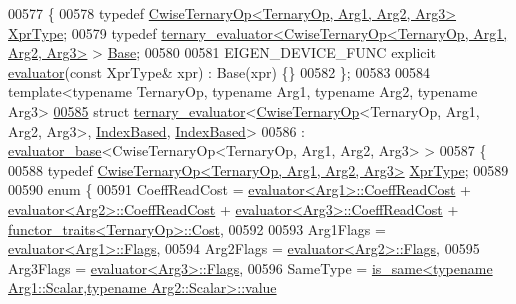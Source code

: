 \begin{DoxyCode}
00577 \{
00578   \textcolor{keyword}{typedef} \hyperlink{group___core___module_class_eigen_1_1_cwise_ternary_op}{CwiseTernaryOp<TernaryOp, Arg1, Arg2, Arg3>} 
      \hyperlink{group___core___module_class_eigen_1_1_cwise_ternary_op}{XprType};
00579   \textcolor{keyword}{typedef} \hyperlink{struct_eigen_1_1internal_1_1ternary__evaluator}{ternary\_evaluator<CwiseTernaryOp<TernaryOp, Arg1, Arg2, Arg3>}
       > \hyperlink{struct_eigen_1_1internal_1_1ternary__evaluator}{Base};
00580   
00581   EIGEN\_DEVICE\_FUNC \textcolor{keyword}{explicit} \hyperlink{struct_eigen_1_1internal_1_1evaluator}{evaluator}(\textcolor{keyword}{const} XprType& xpr) : Base(xpr) \{\}
00582 \};
00583 
00584 \textcolor{keyword}{template}<\textcolor{keyword}{typename} TernaryOp, \textcolor{keyword}{typename} Arg1, \textcolor{keyword}{typename} Arg2, \textcolor{keyword}{typename} Arg3>
\hyperlink{struct_eigen_1_1internal_1_1ternary__evaluator_3_01_cwise_ternary_op_3_01_ternary_op_00_01_arg1_daf42d21bcfee99cfa54e03ffa9506fc}{00585} \textcolor{keyword}{struct }\hyperlink{struct_eigen_1_1internal_1_1ternary__evaluator}{ternary\_evaluator}<\hyperlink{group___core___module_class_eigen_1_1_cwise_ternary_op}{CwiseTernaryOp}<TernaryOp, Arg1, Arg2, Arg3>, 
      \hyperlink{struct_eigen_1_1internal_1_1_index_based}{IndexBased}, \hyperlink{struct_eigen_1_1internal_1_1_index_based}{IndexBased}>
00586   : \hyperlink{struct_eigen_1_1internal_1_1evaluator__base}{evaluator\_base}<CwiseTernaryOp<TernaryOp, Arg1, Arg2, Arg3> >
00587 \{
00588   \textcolor{keyword}{typedef} \hyperlink{group___core___module_class_eigen_1_1_cwise_ternary_op}{CwiseTernaryOp<TernaryOp, Arg1, Arg2, Arg3>} 
      \hyperlink{group___core___module_class_eigen_1_1_cwise_ternary_op}{XprType};
00589   
00590   \textcolor{keyword}{enum} \{
00591     CoeffReadCost = \hyperlink{struct_eigen_1_1internal_1_1evaluator}{evaluator<Arg1>::CoeffReadCost} + 
      \hyperlink{struct_eigen_1_1internal_1_1evaluator}{evaluator<Arg2>::CoeffReadCost} + 
      \hyperlink{struct_eigen_1_1internal_1_1evaluator}{evaluator<Arg3>::CoeffReadCost} + 
      \hyperlink{struct_eigen_1_1internal_1_1functor__traits}{functor\_traits<TernaryOp>::Cost},
00592     
00593     Arg1Flags = \hyperlink{struct_eigen_1_1internal_1_1evaluator}{evaluator<Arg1>::Flags},
00594     Arg2Flags = \hyperlink{struct_eigen_1_1internal_1_1evaluator}{evaluator<Arg2>::Flags},
00595     Arg3Flags = \hyperlink{struct_eigen_1_1internal_1_1evaluator}{evaluator<Arg3>::Flags},
00596     SameType = \hyperlink{struct_eigen_1_1internal_1_1is__same}{is\_same<typename Arg1::Scalar,typename Arg2::Scalar>::value}

\end{DoxyCode}
